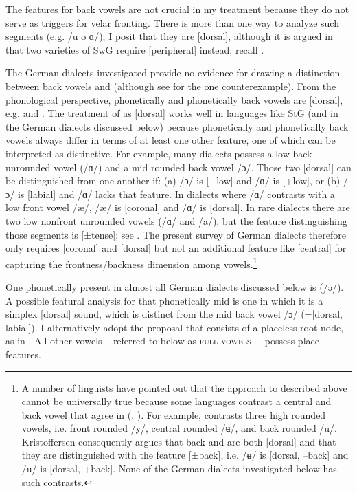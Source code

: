 The features for back vowels are not crucial in my treatment because they do not serve as triggers for velar fronting. There is more than one way to analyze such segments (e.g. /u o ɑ/); I posit that they are [dorsal], although it is argued in  that two varieties of SwG require [peripheral] instead; recall .

The German dialects investigated provide no evidence for drawing a distinction between back vowels and  (although see  for the one counterexample). From the phonological perspective, phonetically  and phonetically back vowels are [dorsal], e.g. \citet{ChomskyHalle1968} and \citet{Rice2002}. The treatment of  as [dorsal] works well in languages like StG (and in the German dialects discussed below) because phonetically  and phonetically back vowels always differ in terms of at least one other feature, one of which can be interpreted as distinctive. For example, many dialects possess a low back unrounded vowel (/ɑ/) and a mid rounded back vowel /ɔ/. Those two [dorsal] can be distinguished from one another if: (a) /ɔ/ is  [−low] and /ɑ/ is [+low], or (b) /ɔ/ is [labial] and /ɑ/ lacks that feature. In dialects where /ɑ/ contrasts with a low front vowel /æ/, /æ/ is [coronal] and /ɑ/ is [dorsal]. In rare dialects there are two low nonfront unrounded vowels (/ɑ/ and /a/), but the feature distinguishing those segments is [±tense]; see . The present survey of German dialects therefore only requires [coronal] and [dorsal] but not an additional feature like [central] for capturing the frontness/backness dimension among vowels.\footnote{A number of linguists have pointed out that the approach to  described above cannot be universally true because some languages contrast a central and back vowel that agree in  (\citealt{Parker2000}, \citealt{Rice2002}). For example,  \citep{Kristoffersen2000} contrasts three high rounded vowels, i.e. front rounded /y/, central rounded /ʉ/, and back rounded /u/. Kristoffersen consequently argues that back and  are both [dorsal] and that they are distinguished with the feature [±back], i.e. /ʉ/ is [dorsal, –back] and /u/ is [dorsal, +back]. None of the German dialects investigated below has such contrasts.}

One phonetically  present in almost all German dialects discussed below is  (/ə/). A possible featural analysis for that phonetically mid  is one in which it is a simplex [dorsal] sound, which is distinct from the mid back vowel /ɔ/ (=[dorsal, labial]). I alternatively adopt the proposal that  consists of a placeless root node, as in . All other vowels -- referred to below as \textsc{full} \textsc{vowels} − possess place features.

